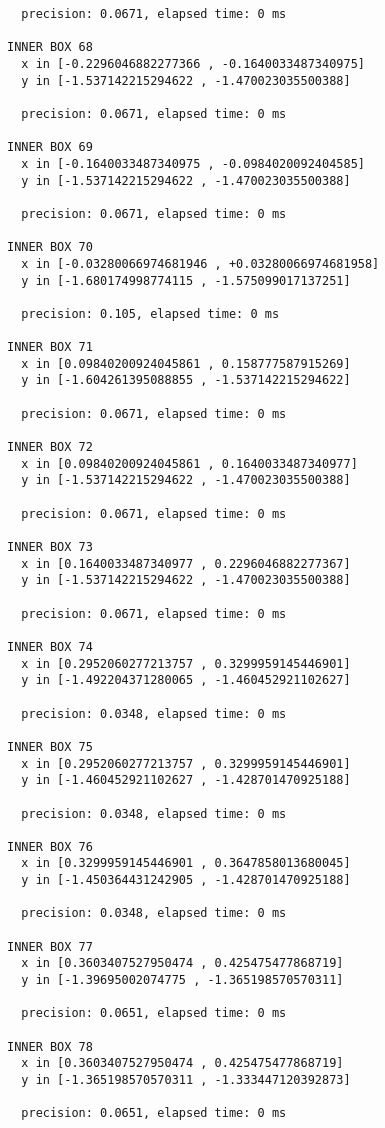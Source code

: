 \begin{verbatim}
  precision: 0.0671, elapsed time: 0 ms

INNER BOX 68
  x in [-0.2296046882277366 , -0.1640033487340975]
  y in [-1.537142215294622 , -1.470023035500388]

  precision: 0.0671, elapsed time: 0 ms

INNER BOX 69
  x in [-0.1640033487340975 , -0.0984020092404585]
  y in [-1.537142215294622 , -1.470023035500388]

  precision: 0.0671, elapsed time: 0 ms

INNER BOX 70
  x in [-0.03280066974681946 , +0.03280066974681958]
  y in [-1.680174998774115 , -1.575099017137251]

  precision: 0.105, elapsed time: 0 ms

INNER BOX 71
  x in [0.09840200924045861 , 0.158777587915269]
  y in [-1.604261395088855 , -1.537142215294622]

  precision: 0.0671, elapsed time: 0 ms

INNER BOX 72
  x in [0.09840200924045861 , 0.1640033487340977]
  y in [-1.537142215294622 , -1.470023035500388]

  precision: 0.0671, elapsed time: 0 ms

INNER BOX 73
  x in [0.1640033487340977 , 0.2296046882277367]
  y in [-1.537142215294622 , -1.470023035500388]

  precision: 0.0671, elapsed time: 0 ms

INNER BOX 74
  x in [0.2952060277213757 , 0.3299959145446901]
  y in [-1.492204371280065 , -1.460452921102627]

  precision: 0.0348, elapsed time: 0 ms

INNER BOX 75
  x in [0.2952060277213757 , 0.3299959145446901]
  y in [-1.460452921102627 , -1.428701470925188]

  precision: 0.0348, elapsed time: 0 ms

INNER BOX 76
  x in [0.3299959145446901 , 0.3647858013680045]
  y in [-1.450364431242905 , -1.428701470925188]

  precision: 0.0348, elapsed time: 0 ms

INNER BOX 77
  x in [0.3603407527950474 , 0.425475477868719]
  y in [-1.39695002074775 , -1.365198570570311]

  precision: 0.0651, elapsed time: 0 ms

INNER BOX 78
  x in [0.3603407527950474 , 0.425475477868719]
  y in [-1.365198570570311 , -1.333447120392873]

  precision: 0.0651, elapsed time: 0 ms


\end{verbatim}
